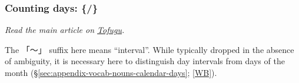 \documentclass[../nihongo-gakushuu-kyouzai.tex]{subfiles}
\begin{document}
\begin{multicols}{2}
\subsubsection{Counting days: \{/\}} \label{sec:appendix-vocab-nouns-counting-days}
\emph{Read the main article on \href{https://www.tofugu.com/japanese/japanese-counter-ka-nichi/}{Tofugu}.}

The 「〜」 suffix here means ``interval''. While typically dropped in the absence of ambiguity, it is necessary here to distinguish day intervals from days of the month (\S\ref{sec:appendix-vocab-nouns-calendar-days}; \href{https://en.wikibooks.org/wiki/Japanese/Lessons/Days\#Periods\_of\_days}{[WB]}).



\end{multicols}
\end{document}
